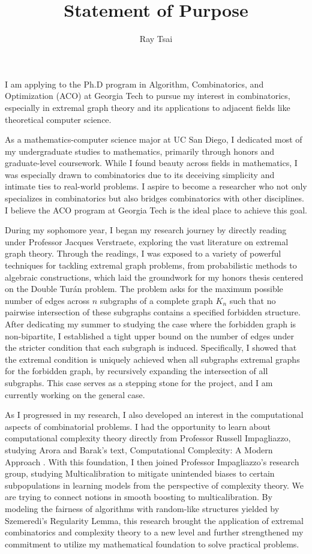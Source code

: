 \documentclass[12pt]{article}
\title{Statement of Purpose}
\author{Ray Tsai}
\date{}
\begin{document}
\maketitle

\vspace{-0.25in}

I am applying to the Ph.D program in Algorithm, Combinatorics, and Optimization (ACO) at Georgia
Tech to pursue my interest in combinatorics, especially in extremal graph theory and its
applications to adjacent fields like theoretical computer science.

As a mathematics-computer science major at UC San Diego, I dedicated most of my undergraduate
studies to mathematics, primarily through honors and graduate-level coursework. While I found beauty
across fields in mathematics, I was especially drawn to combinatorics due to its deceiving
simplicity and intimate ties to real-world problems. I aspire to become a researcher who not only
specializes in combinatorics but also bridges combinatorics with other disciplines. I believe the
ACO program at Georgia Tech is the ideal place to achieve this goal.

During my sophomore year, I began my research journey by directly reading under Professor Jacques
Verstraete, exploring the vast literature on extremal graph theory. Through the readings, I was
exposed to a variety of powerful techniques for tackling extremal graph problems, from probabilistic
methods to algebraic constructions, which laid the groundwork for my honors thesis centered on the
Double Turán problem. The problem asks for the maximum possible number of edges across $n$ subgraphs
of a complete graph $K_n$ such that no pairwise intersection of these subgraphs contains a specified
forbidden structure. After dedicating my summer to studying the case where the forbidden graph is
non-bipartite, I established a tight upper bound on the number of edges under the stricter condition
that each subgraph is induced. Specifically, I showed that the extremal condition is uniquely
achieved when all subgraphs extremal graphs for the forbidden graph, by recursively expanding the
intersection of all subgraphs. This case serves as a stepping stone for the project, and I am
currently working on the general case. 

As I progressed in my research, I also developed an interest in the computational aspects of
combinatorial problems. I had the opportunity to learn about computational complexity theory
directly from Professor Russell Impagliazzo, studying Arora and Barak's text, Computational
Complexity: A Modern Approach \cite{arora2009computational}. With this foundation, I then joined
Professor Impagliazzo's research group, studying Multicalibration to mitigate unintended biases to
certain subpopulations in learning models from the perspective of complexity theory. We are trying
to connect notions in smooth boosting to multicalibration. By modeling the fairness of algorithms
with random-like structures yielded by Szemeredi's Regularity Lemma, this research brought the
application of extremal combinatorics and complexity theory to a new level and further strengthened
my commitment to utilize my mathematical foundation to solve practical problems.
\end{document}
